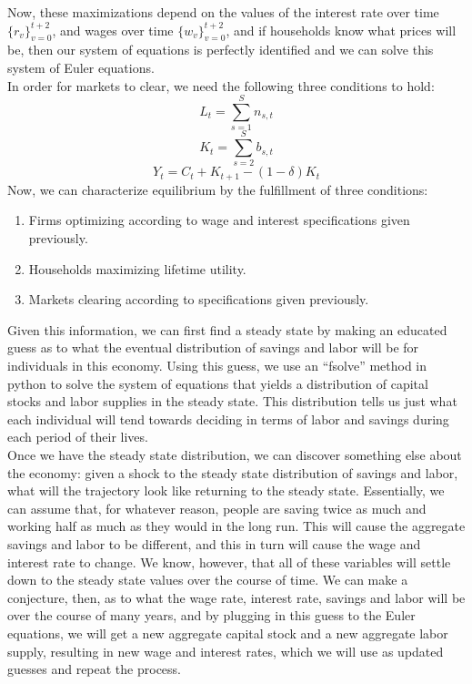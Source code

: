 \documentclass[letterpaper,12pt]{article}
\theoremstyle{definition}
\begin{document}
Now, these maximizations depend on the values of the interest rate over time $\{r_v\}_{v=0}^{t+2}$, and wages over time $\{w_v\}_{v=0}^{t+2}$, and if households know what prices will be, then our system of equations is perfectly identified and we can solve this system of Euler equations.\\
\indent In order for markets to clear, we need the following three conditions to hold:
\[L_t = \sum^{S}_{s=1} n_{s,t} \]
\[K_t = \sum^{S}_{s=2} b_{s,t} \]
\[Y_t = C_t + K_{t+1} - (1 - \delta) K_t\]
Now, we can characterize equilibrium by the fulfillment of three conditions:
\begin{enumerate}
\item Firms optimizing according to wage and interest specifications given previously.
\item Households maximizing lifetime utility.
\item Markets clearing according to specifications given previously.
\end{enumerate}
Given this information, we can first find a steady state by making an educated guess as to what the eventual distribution of savings and labor will be for individuals in this economy. Using this guess, we use an ``fsolve'' method in python to solve the system of equations that yields a distribution of capital stocks and labor supplies in the steady state. This distribution tells us just what each individual will tend towards deciding in terms of labor and savings during each period of their lives.
\\
\indent Once we have the steady state distribution, we can discover something else about the economy: given a shock to the steady state distribution of savings and labor, what will the trajectory look like returning to the steady state. Essentially, we can assume that, for whatever reason, people are saving twice as much and working half as much as they would in the long run. This will cause the aggregate savings and labor to be different, and this in turn will cause the wage and interest rate to change. We know, however, that all of these variables will settle down to the steady state values over the course of time. We can make a conjecture, then, as to what the wage rate, interest rate, savings and labor will be over the course of many years, and by plugging in this guess to the Euler equations, we will get a new aggregate capital stock and a new aggregate labor supply, resulting in new wage and interest rates, which we will use as updated guesses and repeat the process. \\
\end{document}
